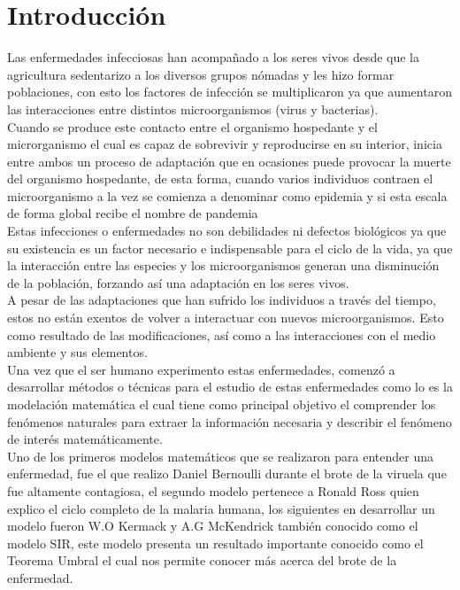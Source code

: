 \documentclass[a4paper,openany,12pt]{book}
\begin{document}
\chapter*{Introducción}

Las enfermedades infecciosas han acompañado a los seres vivos desde que la agricultura sedentarizo a los diversos grupos nómadas y les hizo formar poblaciones, con esto los factores de infección se multiplicaron ya que aumentaron las interacciones entre distintos microorganismos (virus y bacterias).\\

Cuando se produce este contacto entre el organismo hospedante y el microrganismo el cual es capaz de sobrevivir y reproducirse en su interior, inicia entre ambos un proceso de adaptación que en ocasiones puede provocar la muerte del organismo hospedante, de esta forma, cuando varios individuos contraen el microorganismo a la vez se comienza a denominar como epidemia y si esta escala de forma global recibe el nombre de pandemia\\

Estas infecciones o enfermedades no son debilidades ni defectos biológicos ya que su existencia es un factor necesario e indispensable para el ciclo de la vida, ya que la interacción entre las especies y los microorganismos generan una disminución de la población, forzando así una adaptación en los seres vivos.\\

A pesar de las adaptaciones que han sufrido los individuos a través del tiempo, estos no están exentos de volver a interactuar con nuevos microorganismos. Esto como resultado de las modificaciones, así como a las interacciones con el medio ambiente y sus elementos. \cite{HyFP}\\


Una vez que el ser humano experimento estas enfermedades, comenzó a desarrollar métodos o técnicas para el estudio de estas enfermedades 
como lo es la modelación matemática el cual tiene como principal objetivo el comprender los fenómenos naturales para extraer la información necesaria y describir el fenómeno de interés matemáticamente.\\ 

Uno de los primeros modelos matemáticos que se realizaron para entender una enfermedad, fue el que realizo Daniel Bernoulli durante el brote de la viruela que fue altamente contagiosa, el segundo modelo pertenece a Ronald Ross quien explico el ciclo completo de la malaria humana, los siguientes en desarrollar un modelo fueron W.O Kermack y A.G McKendrick también conocido como el modelo SIR, este modelo presenta un resultado importante conocido como el Teorema Umbral el cual nos permite conocer más acerca del brote de la enfermedad.\\
\end{document}

